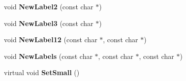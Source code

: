 \begin{DoxyCompactItemize}
\item 
\hypertarget{classTOnePadDisplay_a421c77b970e10697b7393973fe73595a}{void {\bfseries New\-Label2} (const char $\ast$)}\label{classTOnePadDisplay_a421c77b970e10697b7393973fe73595a}

\item 
\hypertarget{classTOnePadDisplay_a0a7123830cd00d3840b71d18770b949a}{void {\bfseries New\-Label3} (const char $\ast$)}\label{classTOnePadDisplay_a0a7123830cd00d3840b71d18770b949a}

\item 
\hypertarget{classTOnePadDisplay_ae4edbbb5448058e06a39e52e2978b983}{void {\bfseries New\-Label12} (const char $\ast$, const char $\ast$)}\label{classTOnePadDisplay_ae4edbbb5448058e06a39e52e2978b983}

\item 
\hypertarget{classTOnePadDisplay_a9781feddc47f3899828847d99a18bade}{void {\bfseries New\-Labels} (const char $\ast$, const char $\ast$, const char $\ast$)}\label{classTOnePadDisplay_a9781feddc47f3899828847d99a18bade}

\item 
\hypertarget{classTOnePadDisplay_a81a6d7a95df514c5757bc4f5ee2ff3d6}{virtual void {\bfseries Set\-Small} ()}\label{classTOnePadDisplay_a81a6d7a95df514c5757bc4f5ee2ff3d6}

\end{DoxyCompactItemize}
